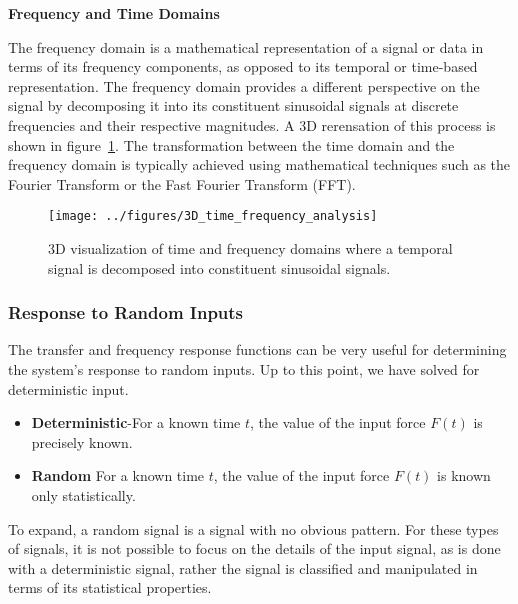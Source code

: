 \documentclass[12pt,letter]{article}
\begin{document}
	\vspace{-2ex}

\begin{review}
	\label{sec:TimeFrequencySpectrum}

	\textbf{Frequency and Time Domains}

	\noindent The frequency domain is a mathematical representation of a signal or data in terms of its frequency components, as opposed to its temporal or time-based representation. The frequency domain provides a different perspective on the signal by decomposing it into its constituent sinusoidal signals at discrete frequencies and their respective magnitudes. A 3D rerensation of this process is shown in figure~\ref{fig:3D_time_frequency_analysis}. The transformation between the time domain and the frequency domain is typically achieved using mathematical techniques such as the Fourier Transform or the Fast Fourier Transform (FFT).

		\begin{figure}[H]
			\centering
			\vspace{-1ex}
			\texttt{[image: ../figures/3D\_time\_frequency\_analysis]}
			\vspace{-2ex}
			\caption{3D visualization of time and frequency domains where a temporal signal is decomposed into constituent sinusoidal signals.}
			\label{fig:3D_time_frequency_analysis}
		\end{figure}

\end{review}

\pagebreak
\subsubsection{Response to Random Inputs}
The transfer and frequency response functions can be very useful for determining the system's response to random inputs. Up to this point, we have solved for deterministic input. 

\begin{itemize}
\item \textbf{Deterministic}-For a known time $t$, the value of the input force $F(t)$ is precisely known. 
\item \textbf{Random} For a known time $t$, the value of the input force $F(t)$ is known only statistically. 
\end{itemize}

To expand, a random signal is a signal with no obvious pattern. For these types of signals, it is not possible to focus on the details of the input signal, as is done with a deterministic signal, rather the signal is classified and manipulated in terms of its statistical properties. 
\end{document}
